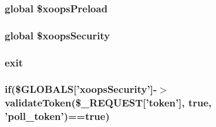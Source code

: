 \hypertarget{poll_2index_8php_a85f18f874c1d75c3d8e442d2f1f2bb2d}{
\subsubsection[{\$xoops\-Preload}]{\setlength{\rightskip}{0pt plus 5cm}global \$xoops\-Preload}}\label{poll_2index_8php_a85f18f874c1d75c3d8e442d2f1f2bb2d}
\hypertarget{poll_2index_8php_af6ccf79677b0f355d9b7fdaa45e96b3b}{
\subsubsection[{\$xoops\-Security}]{\setlength{\rightskip}{0pt plus 5cm}global \$xoops\-Security}}\label{poll_2index_8php_af6ccf79677b0f355d9b7fdaa45e96b3b}
\hypertarget{poll_2index_8php_a6733eb5f605d09eaede9845835d71c4e}{
\subsubsection[{exit}]{\setlength{\rightskip}{0pt plus 5cm}exit}}\label{poll_2index_8php_a6733eb5f605d09eaede9845835d71c4e}
\hypertarget{poll_2index_8php_ae404acbb304be6b6ac443de921697faf}{
\subsubsection[{if}]{\setlength{\rightskip}{0pt plus 5cm}if(\$G\-L\-O\-B\-A\-L\-S\mbox{[}'xoops\-Security'\mbox{]}-\/$>$validate\-Token(\$\-\_\-\-R\-E\-Q\-U\-E\-S\-T\mbox{[}'token'\mbox{]}, true, 'poll\-\_\-token')==true)}}\label{poll_2index_8php_ae404acbb304be6b6ac443de921697faf}
